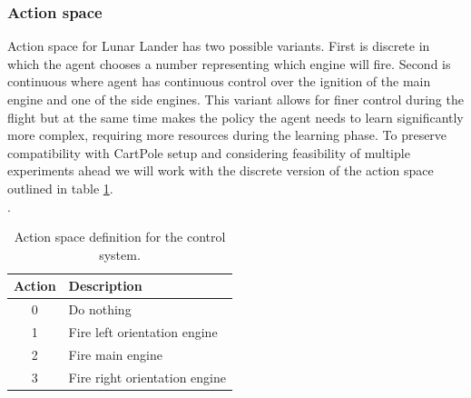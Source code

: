 \subsubsection{Action space}
Action space for Lunar Lander has two possible variants. First is discrete in which the agent chooses a number representing which engine will fire. Second is continuous where agent has continuous control over the ignition of the main engine and one of the side engines. This variant allows for finer control during the flight but at the same time makes the policy the agent needs to learn significantly more complex, requiring more resources during the learning phase. To preserve compatibility with CartPole setup and considering feasibility of multiple experiments ahead we will work with the discrete version of the action space outlined in table \ref{tab:llactionspace}.\\
.
\begin{table}[h]
	\centering
	\begin{tabular}{|c|l|}
		\hline
		\textbf{Action} & \textbf{Description} \\
		\hline
		0 & Do nothing \\
		1 & Fire left orientation engine \\
		2 & Fire main engine \\
		3 & Fire right orientation engine \\
		\hline
	\end{tabular}
	\caption{Action space definition for the control system.}
	\label{tab:llactionspace}
\end{table}




 
 

